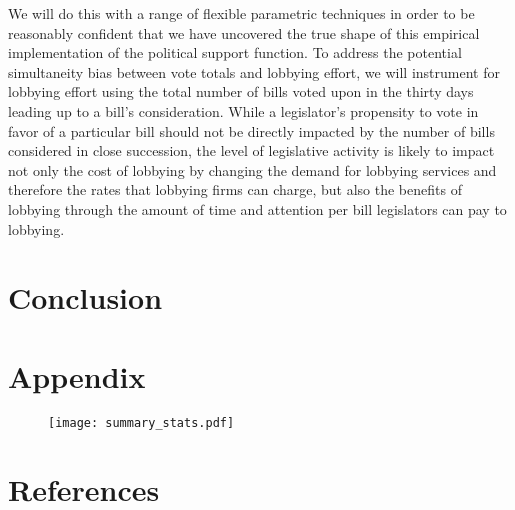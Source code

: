 \documentclass[12pt]{article}
\begin{document}
We will do this with a range of flexible parametric techniques in order to be reasonably confident that we have uncovered the true shape of this empirical implementation of the political support function. To address the potential simultaneity bias between vote totals and lobbying effort, we will instrument for lobbying effort using the total number of bills voted upon in the thirty days leading up to a bill's consideration. While a legislator's propensity to vote in favor of a particular bill should not be directly impacted by the number of bills considered in close succession, the level of legislative activity is likely to impact not only the cost of lobbying by changing the demand for lobbying services and therefore the rates that lobbying firms can charge, but also the benefits of lobbying through the amount of time and attention per bill legislators can pay to lobbying. \\



\section{Conclusion}
\label{sec:concl}

			






\section{Appendix}
\begin{figure}
\texttt{[image: summary\_stats.pdf]}
\end{figure}

			




\newpage
\section{References}
\end{document}
